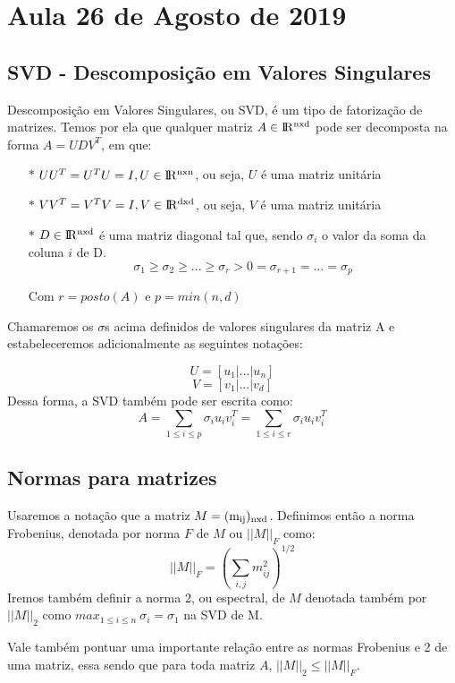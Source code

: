 \section{Aula 26 de Agosto de 2019}
\label{2019_08_26}

\subsection{SVD - Descomposição em Valores Singulares}
\[\]
Descomposição em Valores Singulares, ou SVD, é um tipo de fatorização de matrizes. Temos por ela que qualquer matriz $ A \in {\rm I\!R^{nxd}}$ pode ser decomposta na forma $A = UDV^T$, em que:

\begin{itemize}
\item[$\ast$]$UU^T = U^TU = I, U \in \rm I\!R^{nxn}$, ou seja, $U$ é uma matriz unitária
\item[$\ast$]$VV^T = V^TV = I, V \in \rm I\!R^{dxd}$, ou seja, $V$ é uma matriz unitária
\item[$\ast$]$D \in \rm I\!R^{nxd}$ é uma matriz diagonal tal que, sendo $\sigma_i$ o valor da soma da coluna $i$ de D.
 \[\sigma_1 \geq \sigma_2 \geq ... \geq \sigma_r > 0 = \sigma_{r+1} = ... = \sigma_p \]
 
Com $ r = posto(A)$ e $p = min(n,d)$
\end{itemize}
\[\]
Chamaremos os $\sigma$s acima definidos de valores singulares da matriz A e estabeleceremos adicionalmente as seguintes notações:

\[U = [ u_1 | ... | u_n ]\]
\[V = [v_1 | ... | v_d]\]
\[\]
Dessa forma, a SVD também pode ser escrita como:
\[A = \sum_{1 \leq i \leq p} \sigma_i u_i v_i^T =  \sum_{1 \leq i \leq r} \sigma_i u_i v_i^T \]

\subsection{Normas para matrizes}

Usaremos a notação que a matriz $M = \rm{(m_{ij})_{nxd}}$.
Definimos então a norma Frobenius, denotada por norma $F$ de $M$ ou
$||M||_F$ como:
\[||M||_F = ( \sum_{i,j} m_{ij}^2)^{1/2} \]
Iremos também definir a norma 2, ou espectral, de $M$ denotada também por $||M||_2$ como $ max_{1\leq i \leq n} \ \sigma_i = \sigma_1 $ na SVD de M.

\[\]
Vale também pontuar uma importante relação entre as normas Frobenius e 2 de uma matriz, essa sendo que para toda matriz $A$, $||M||_2 \leq ||M||_F$.

